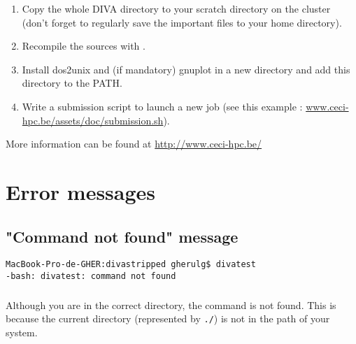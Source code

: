 \begin{enumerate}
 \item Copy the whole DIVA directory to your scratch directory on the cluster (don't forget to regularly save the important files to your home directory). 
 \item Recompile the sources with .
 \item Install dos2unix and (if mandatory) gnuplot in a new directory  and add this directory to the \textdollar PATH.
 \item Write a submission script to launch a new job (see this example : \url{www.ceci-hpc.be/assets/doc/submission.sh}).
 
\end{enumerate}

More information can be found at \url{http://www.ceci-hpc.be/}


\section{Error messages}



\subsection{"Command not found" message}

\begin{lstlisting}[style=Bash]
MacBook-Pro-de-GHER:divastripped gherulg$ divatest
-bash: divatest: command not found
\end{lstlisting}


\subsubsection{\question}

Although you are in the correct directory, the command is not found. This is because the current directory (represented by \texttt{./}) is not in the path of your system. 

\subsubsection{\answer}

